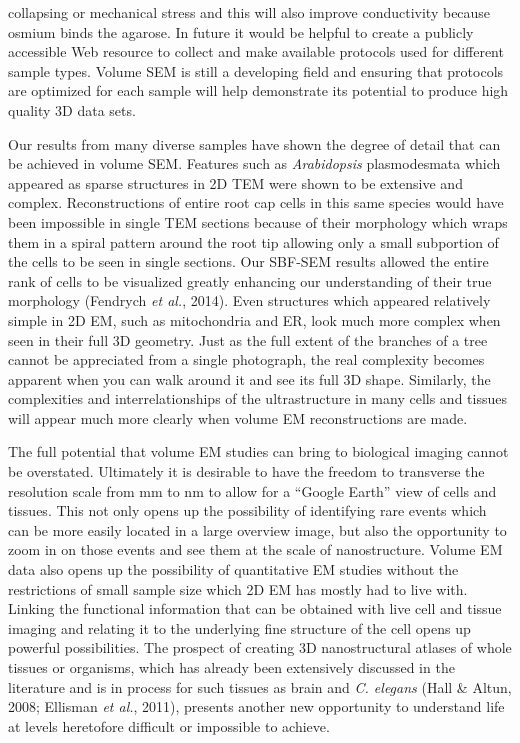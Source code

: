 \documentclass{article}
\begin{document}
collapsing or mechanical stress and this will also improve conductivity because osmium binds the agarose. In future it would be helpful to create a publicly accessible Web resource to collect and make available protocols used for different sample types. Volume SEM is still a developing field and ensuring that protocols are optimized for each sample will help demonstrate its potential to produce high quality 3D data sets.

Our results from many diverse samples have shown the degree of detail that can be achieved in volume SEM. Features such as \textit{Arabidopsis} plasmodesmata which appeared as sparse structures in 2D TEM were shown to be extensive and complex. Reconstructions of entire root cap cells in this same species would have been impossible in single TEM sections because of their morphology which wraps them in a spiral pattern around the root tip allowing only a small subportion of the cells to be seen in single sections. Our SBF-SEM results allowed the entire rank of cells to be visualized greatly enhancing our understanding of their true morphology (Fendrych \textit{et al.}, 2014). Even structures which appeared relatively simple in 2D EM, such as mitochondria and ER, look much more complex when seen in their full 3D geometry. Just as the full extent of the branches of a tree cannot be appreciated from a single photograph, the real complexity becomes apparent when you can walk around it and see its full 3D shape. Similarly, the complexities and interrelationships of the ultrastructure in many cells and tissues will appear much more clearly when volume EM reconstructions are made.

The full potential that volume EM studies can bring to biological imaging cannot be overstated. Ultimately it is desirable to have the freedom to transverse the resolution scale from mm to nm to allow for a “Google Earth” view of cells and tissues. This not only opens up the possibility of identifying rare events which can be more easily located in a large overview image, but also the opportunity to zoom in on those events and see them at the scale of nanostructure. Volume EM data also opens up the possibility of quantitative EM studies without the restrictions of small sample size which 2D EM has mostly had to live with. Linking the functional information that can be obtained with live cell and tissue imaging and relating it to the underlying fine structure of the cell opens up powerful possibilities. The prospect of creating 3D nanostructural atlases of whole tissues or organisms, which has already been extensively discussed in the literature and is in process for such tissues as brain and \textit{C. elegans} (Hall \& Altun, 2008; Ellisman \textit{et al.}, 2011), presents another new opportunity to understand life at levels heretofore difficult or impossible to achieve.
\end{document}
